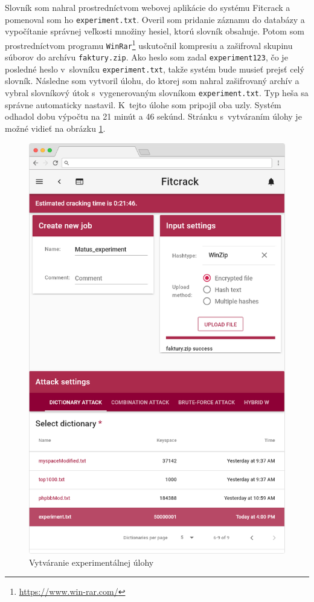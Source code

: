 \documentclass[zadani,slovak]{fitthesis}
\begin{document}
\noindent
Slovník som nahral prostredníctvom webovej aplikácie do systému Fitcrack a pomenoval som ho \texttt{experiment.txt}. Overil som pridanie záznamu do databázy a vypočítanie správnej veľkosti množiny hesiel, ktorú slovník obsahuje. Potom som prostredníctvom programu \texttt{WinRar}\footnote{\url{https://www.win-rar.com/}} uskutočnil kompresiu a zašifroval skupinu súborov do archívu \texttt{faktury.zip}. Ako heslo som zadal \texttt{experiment123}, čo je posledné heslo v~slovníku \texttt{experiment.txt}, takže systém bude musieť prejsť celý slovník. Následne som vytvoril úlohu, do ktorej som nahral zašifrovaný archív a vybral slovníkový útok s~vygenerovaným slovníkom \texttt{experiment.txt}. Typ heša sa správne automaticky nastavil. K~tejto úlohe som pripojil oba uzly. Systém odhadol dobu výpočtu na 21 minút a 46 sekúnd. Stránku s~vytváraním úlohy je možné vidieť na obrázku \ref{fig:exp1}. 
\begin{figure}[H]
    \centering
    \includegraphics[scale=0.4]{obrazky/exp1Frame.PNG}
    \caption{Vytváranie experimentálnej úlohy}
    \label{fig:exp1}
\end{figure}
\end{document}
